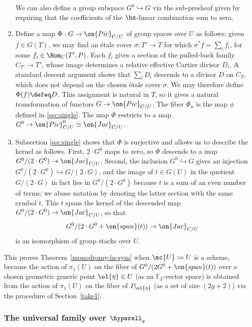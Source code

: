 \begin{enumerate}[itemsep=0.25cm]
	We can also define a group subspace ${G}^0 \hookrightarrow {G}$ via the sub-presheaf given by requiring that the coefficients of the $\bz$-linear combination sum to zero.
	\item Define a map $\Phi: {G} \to \on{Pic}_{{C}/{U}}$ of group spaces over ${U}$ as follows: given $f \in {G}(T)$, we may find an \'etale cover $\sigma: T' \to T$ for which $\sigma^* f = \sum_i f_i$, for some $f_i \in \Hom_{{U}}(T', {P})$. Each $f_i$ gives a section of the pulled-back family ${C}_{T'} \to T'$, whose image determines a relative effective Cartier divisor $D_i$. A standard descent argument shows that $\sum_i D_i$ descends to a divisor $D$ on ${C}_T$, which does not depend on the chosen \'etale cover $\sigma$. We may therefore define $\Phi(f) \defeq D$. This assignment is natural in $T$, so it gives a natural transformation of functors ${G} \to \on{Pic}_{{C}/{U}}$. The fiber $\Phi_u$ is the map $\phi$ defined in \ref{sec:single}. The map $\Phi$ restricts to a map ${G}^0 \to \on{Pic}_{{C}/{U}}^0 \simeq \on{Jac}_{{C}/{U}}$.
	\item Subsection \ref{sec:single} shows that $\Phi$ is surjective and allows us to describe the kernel as follows. First, $2 \cdot G^0$ maps to zero, so $\Phi$ descends to a map $G^0 / (2 \cdot G^0) \to \on{Jac}_{C/U}$. Second, the inclusion $G^0 \hookrightarrow G$ gives an injection $G^0 / (2 \cdot G^0) \hookrightarrow G / (2 \cdot G)$, and the image of $t \in G(U)$ in the quotient $G / (2\cdot G)$ in fact lies in $G^0 / (2 \cdot G^0)$ because $t$ is a sum of an even number of terms; we abuse notation by denoting the latter section with the same symbol $t$. This $t$ spans the kernel of the descended map $G^0 / (2 \cdot G^0) \to \on{Jac}_{C/U}$, so that
	\[
		G^0 / (2 \cdot G^0 + \on{span}(t)) \to \on{Jac}_{C/U}
	\]
	is an isomorphism of group stacks over $U$.
\end{enumerate}
This proves Theorem~\ref{monodromy-in-sym} when $\mc{U} := U$ is a scheme, because the action of $\pi_1(U)$ on the fiber of $G^0 / (2G^0 + \on{span}(t))$ over a chosen geometric generic point $\ol{\eta} \in U$ (as an $\mathbb{F}_2$-vector space) is obtained from the action of $\pi_1(U)$ on the fiber of $P_{\ol{\eta}}$ (as a set of size $(2g+2)$) via the procedure of Section~\ref{take1}.

\subsubsection{The universal family over $\hyperell_g$} \label{part3}


